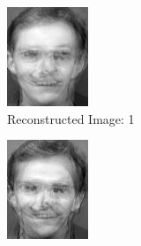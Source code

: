 \documentclass[12pt]{article}
\begin{document}
\begin{figure}
\begin{subfigure}[b]{0.20\textwidth}
		\includegraphics[width=\textwidth]{Task4.6_Images/ReconstructedImage1.jpg}
		\caption{Reconstructed Image: 1}
	\end{subfigure}\quad
	\begin{subfigure}[b]{0.20\textwidth}
		\includegraphics[width=\textwidth]{Task4.6_Images/ReconstructedImage2.jpg}

\end{subfigure}
\end{figure}
\end{document}
